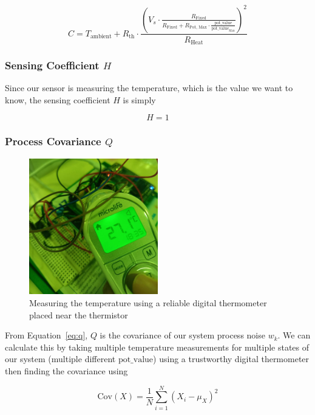 \documentclass[12pt,a4paper]{article}
\begin{document}
\begin{equation*}
    C = T_{\text{ambient}} + R_{\text{th}} \cdot \frac{\left(V_s \cdot \frac{R_{\text{Fixed}}}{R_{\text{Fixed}} + R_{\text{Pot, Max}} \cdot \frac{\text{pot\_value}}{\text{pot\_value}_{\text{Max}}}}\right)^2}{R_{\text{Heat}}}
\end{equation*}

\subsubsection{Sensing Coefficient $H$}
Since our sensor is measuring the temperature, which is the value we want to know, the sensing coefficient $H$ is simply

\begin{equation*}
    H = 1
\end{equation*}

\subsubsection{Process Covariance $Q$}

\begin{figure}[h]
    \centering
    \includegraphics[width=0.5\textwidth]{images/measure_temp.jpg}
    \caption{Measuring the temperature using a reliable digital thermometer placed near the thermistor}
    \label{fig:measure-temp}
\end{figure}

From Equation~\eqref{eq:q}, $Q$ is the covariance of our system process noise $w_k$. We can calculate this by taking multiple temperature measurements for multiple states of our system (multiple different $\text{pot\_value}$) using a trustworthy digital thermometer then finding the covariance using


\begin{equation}
    \label{eq:cov}
    \mathrm{Cov}(X) = \frac{1}{N} \sum_{i=1}^{N} (X_i - \mu_X)^2
\end{equation}
\end{document}
